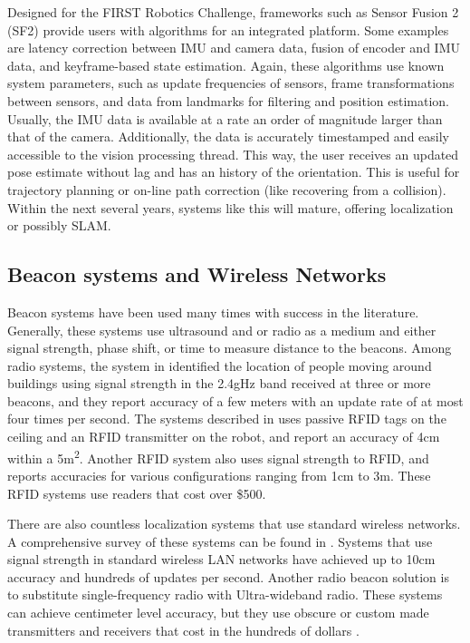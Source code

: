 \documentclass{article}
\begin{document}
      Designed for the FIRST Robotics Challenge, frameworks such as Sensor Fusion 2 (SF2) provide users with algorithms for an integrated platform. Some examples are latency correction between IMU and camera data, fusion of encoder and IMU data, and keyframe-based state estimation. Again, these algorithms use known system parameters, such as update frequencies of sensors, frame transformations between sensors, and data from landmarks for filtering and position estimation. Usually, the IMU data is available at a rate an order of magnitude larger than that of the camera. Additionally, the data is accurately timestamped and easily accessible to the vision processing thread. This way, the user receives an updated pose estimate without lag and has an history of the orientation. This is useful for trajectory planning or on-line path correction (like recovering from a collision). Within the next several years, systems like this will mature, offering localization or possibly SLAM.

  \subsection{Beacon systems and Wireless Networks}

    Beacon systems have been used many times with success in the literature. Generally, these systems use ultrasound and or radio as a medium and either signal strength, phase shift, or time to measure distance to the beacons. Among radio systems, the system in \cite{bahl_radar:_2000} identified the location of people moving around buildings using signal strength in the 2.4gHz band received at three or more beacons, and they report accuracy of a few meters with an update rate of at most four times per second. The systems described in \cite{digiampaolo_mobile_2014} uses passive RFID tags on the ceiling and an RFID transmitter on the robot, and report an accuracy of 4\si{\centi\meter} within a 5\si{\square\meter}. Another RFID system \cite{saab_standalone_2011} also uses signal strength to RFID, and reports accuracies for various configurations ranging from 1\si{\centi\meter} to 3\si{\meter}. These RFID systems use readers that cost over \$500.

    There are also countless localization systems that use standard wireless networks. A comprehensive survey of these systems can be found in \cite{liu_survey_2007}. Systems that use signal strength in standard wireless LAN networks have achieved up to 10\si{\centi\meter} accuracy and hundreds of updates per second. Another radio beacon solution is to substitute single-frequency radio with Ultra-wideband radio. These systems can achieve centimeter level accuracy, but they use obscure or custom made transmitters and receivers that cost in the hundreds of dollars \cite{noauthor_dart_nodate} \cite{noauthor_pozyx_nodate}.
\end{document}
